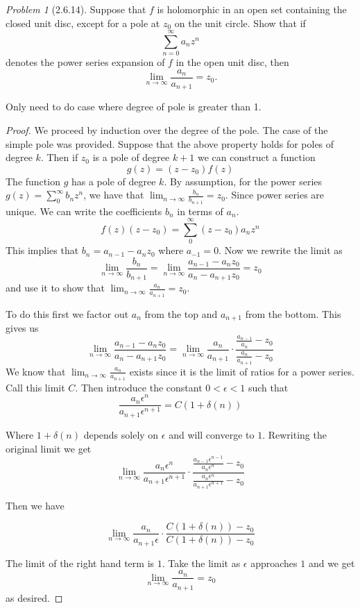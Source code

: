 \documentclass[10pt]{article}
\theoremstyle{remark}
\newtheorem{problem}{Problem}
\theoremstyle{remark}
\begin{document}
\begin{problem}[2.6.14]
  Suppose that $f$ is holomorphic in an open set containing the closed unit disc,
  except for a pole at $z_0$ on the unit circle. Show that if
  \[
    \sum_{n=0}^\infty a_n z^n
  \]
  denotes the power series expansion of $f$ in the open unit disc, then
  \[
    \lim_{n\rightarrow\infty}\frac{a_n}{a_{n+1}}=z_0.
  \]
  
  Only need to do case where degree of pole is greater than 1.
\end{problem}

\begin{proof}
  We proceed by induction over the degree of the pole. The case of the simple
  pole was provided. Suppose that the above property holds for poles of
  degree $k$. Then if $z_0$ is a pole of degree $k+1$ we can construct a function
  \[
    g(z)=(z-z_0)f(z)
  \]
  The function $g$ has a pole of degree $k$. By assumption, for the power series
  $g(z)=\sum_0^\infty b_nz^n$, we have that $\lim_{n\rightarrow\infty}\frac{b_n}{b_{n+1}}=z_0$. Since
  power series are unique. We can write the coefficients $b_n$ in terms of $a_n$.
  \[
    f(z)(z-z_0)=\sum_0^\infty(z-z_0)a_nz^n
  \]
  This implies that $b_n=a_{n-1}-a_nz_0$ where $a_{-1}=0$. Now we rewrite the limit
  as
  \[
    \lim_{n\rightarrow\infty}\frac{b_n}{b_{n+1}}=\lim_{n\rightarrow\infty}\frac{a_{n-1}-a_nz_0}{a_n-a_{n+1}z_0}=z_0
  \]
  and use it to show that $\lim_{n\rightarrow\infty}\frac{a_n}{a_{n+1}}=z_0$.

  To do this first we factor out $a_n$ from the top and $a_{n+1}$ from the bottom. This
  gives us
  \[
    \lim_{n\rightarrow\infty}\frac{a_{n-1}-a_nz_0}{a_n-a_{n+1}z_0}=\lim_{n\rightarrow\infty}\frac{a_n}{a_{n+1}}\cdot\frac{\frac{a_{n-1}}{a_n}-z_0}{\frac{a_n}{a_{n+1}}-z_0}
  \]
  We know that $\lim_{n\rightarrow\infty}\frac{a_n}{a_{n+1}}$ exists since it is
  the limit of ratios for a power series. Call this limit $C$. Then introduce the constant $0<\epsilon<1$
  such that
  \[
    \frac{a_n\epsilon^n}{a_{n+1}\epsilon^{n+1}}=C(1+\delta(n))
  \]

  Where $1+\delta(n)$ depends solely on $\epsilon$ and will converge to $1$. Rewriting the original limit we get
  \[
    \lim_{n\rightarrow\infty}\frac{a_n\epsilon^n}{a_{n+1}\epsilon^{n+1}}\cdot\frac{\frac{a_{n-1}\epsilon^{n-1}}{a_n\epsilon^{n}}-z_0}{\frac{a_n\epsilon^{n}}{a_{n+1}\epsilon^{n+1}}-z_0}
  \]

  Then we have

  \[
    \lim_{n\rightarrow\infty}\frac{a_n}{a_{n+1}\epsilon}\cdot\frac{C(1+\delta(n))-z_0}{C(1+\delta(n))-z_0}
  \]

  The limit of the right hand term is $1$. Take the limit as $\epsilon$ approaches $1$ and we
  get
  \[
    \lim_{n\rightarrow\infty}\frac{a_n}{a_{n+1}}=z_0
  \]
  as desired.
\end{proof}
\end{document}
